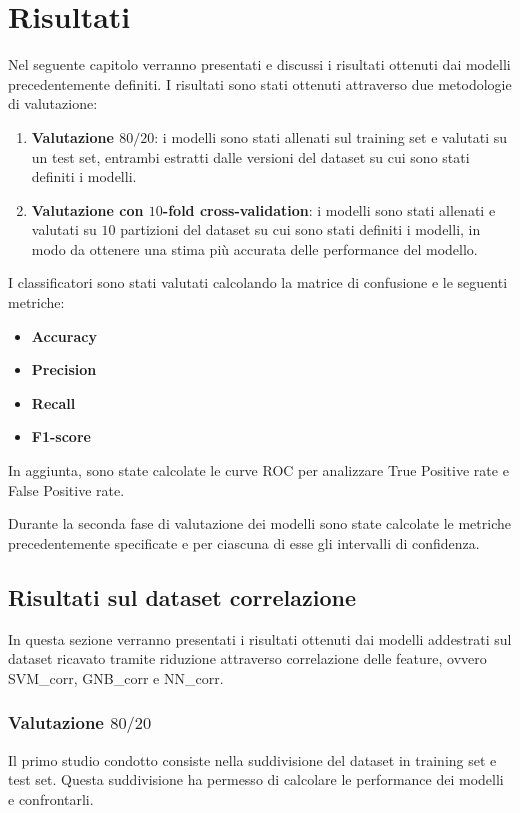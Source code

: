 \chapter{Risultati} \label{chp:risultati}
Nel seguente capitolo verranno presentati e discussi i risultati ottenuti dai
modelli precedentemente definiti. I risultati sono stati ottenuti attraverso
due metodologie di valutazione:
\begin{enumerate}
    \item \textbf{Valutazione $80/20$}: i modelli sono stati allenati sul
          training set e valutati su un test set, entrambi estratti dalle versioni del dataset
          su cui sono stati definiti i modelli.
    \item \textbf{Valutazione con $10$-fold cross-validation}: i modelli sono
          stati allenati e valutati su $10$ partizioni del dataset su cui sono stati 
          definiti i modelli, in modo da ottenere una stima più accurata delle 
          performance del modello.
\end{enumerate}

I classificatori sono stati valutati calcolando la matrice di confusione e le
seguenti metriche:
\begin{itemize}
    \item \textbf{Accuracy}
    \item \textbf{Precision}
    \item \textbf{Recall}
    \item \textbf{F1-score}
\end{itemize}

In aggiunta, sono state calcolate le curve ROC per analizzare True Positive rate
e False Positive rate.

Durante la seconda fase di valutazione dei modelli sono state calcolate le
metriche precedentemente specificate e per ciascuna di esse gli intervalli di
confidenza.
\section{Risultati sul dataset correlazione} \label{sec:risultati_corr}
In questa sezione verranno presentati i risultati ottenuti dai modelli addestrati
sul dataset ricavato tramite riduzione attraverso correlazione delle feature,
ovvero SVM\_corr, GNB\_corr e NN\_corr.

\subsection{Valutazione $80/20$}
Il primo studio condotto consiste nella suddivisione del dataset in training
set e test set. Questa suddivisione ha permesso di calcolare le performance dei
modelli e confrontarli.

